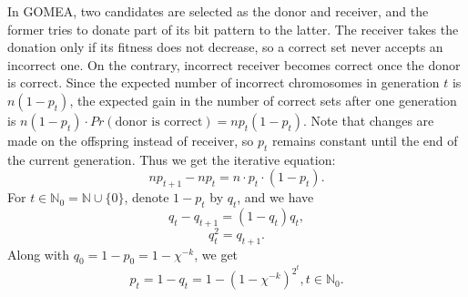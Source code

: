 \documentclass{sig-alternate}
\begin{document}
In GOMEA, two candidates are selected as the donor and receiver,
and the former tries to donate part of its bit pattern to the latter.
The receiver takes the donation only if its fitness does not decrease,
so a correct set never accepts an incorrect one.
On the contrary, incorrect receiver becomes correct once the donor is correct.
Since the expected number of incorrect chromosomes in generation $t$ is $n\left(1-p_t\right)$,
the expected gain in the number of correct sets after one generation is
$n\left(1-p_t\right)\cdot Pr\left(\text{donor is correct}\right)
=n p_t\left(1-p_t\right)$.
Note that changes are made on the offspring instead of receiver,
so $p_t$ remains constant until the end of the current generation.
Thus we get the iterative equation:
\begin{equation}
\label{eq:p_ite}
n p_{t+1}-n p_t = n\cdot p_t\cdot\left(1-p_t\right).
\end{equation}
For $t\in{\mathbb N}_0 = {\mathbb N} \cup \{0\}$,
denote $1-p_t$ by $q_t$, and we have
\begin{equation*}
q_t-q_{t+1} = \left(1-q_t\right)q_t,
\end{equation*}
\begin{equation*}
q_t^2 =  q_{t+1}.
\end{equation*}
Along with $q_0=1-p_0=1-\chi^{-k}$, we get
\begin{equation} \label{eq:p_t}
p_t = 1-q_t=1-\left(1-\chi^{-k}\right)^{2^t}, t\in{\mathbb N}_0.
\end{equation}
\end{document}

